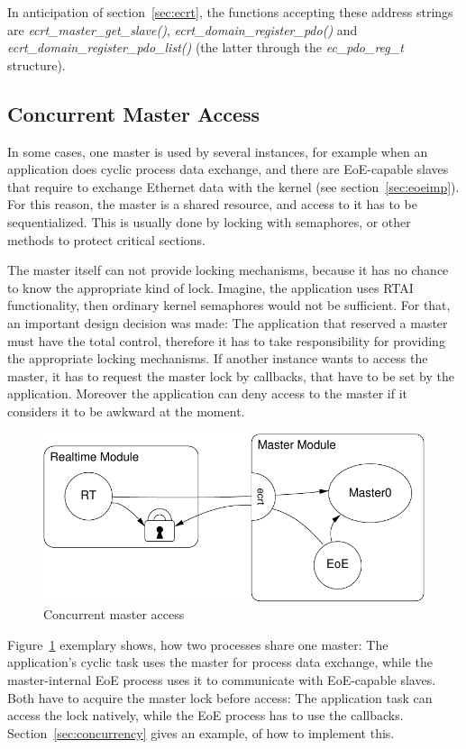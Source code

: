 \documentclass[a4paper,12pt,BCOR6mm,bibtotoc,idxtotoc]{scrbook}
\begin{document}
In anticipation of section~\ref{sec:ecrt}, the functions accepting
these address strings are \textit{ecrt\_\-master\_\-get\_slave()},
\textit{ecrt\_domain\_register\_pdo()} and
\textit{ecrt\_domain\_register\_pdo\_list()} (the latter through the
\textit{ec\_pdo\_reg\_t} structure).


\subsection{Concurrent Master Access}
\label{sec:concurr}

In some cases, one master is used by several instances, for example when an
application does cyclic process data exchange, and there are EoE-capable slaves
that require to exchange Ethernet data with the kernel (see
section~\ref{sec:eoeimp}). For this reason, the master is a shared resource,
and access to it has to be sequentialized. This is usually done by locking with
semaphores, or other methods to protect critical sections.

The master itself can not provide locking mechanisms, because it has no chance
to know the appropriate kind of lock. Imagine, the application uses RTAI
functionality, then ordinary kernel semaphores would not be sufficient. For
that, an important design decision was made: The application that reserved a
master must have the total control, therefore it has to take responsibility for
providing the appropriate locking mechanisms. If another instance wants to
access the master, it has to request the master lock by callbacks, that have to
be set by the application. Moreover the application can deny access to the
master if it considers it to be awkward at the moment.

\begin{figure}[htbp]
  \centering
  \includegraphics[width=.6\textwidth]{images/master-locks}
  \caption{Concurrent master access}
  \label{fig:locks}
\end{figure}

Figure~\ref{fig:locks} exemplary shows, how two processes share one master: The
application's cyclic task uses the master for process data exchange, while the
master-internal EoE process uses it to communicate with EoE-capable slaves.
Both have to acquire the master lock before access: The application task can
access the lock natively, while the EoE process has to use the callbacks.
Section~\ref{sec:concurrency} gives an example, of how to implement this.
\end{document}
